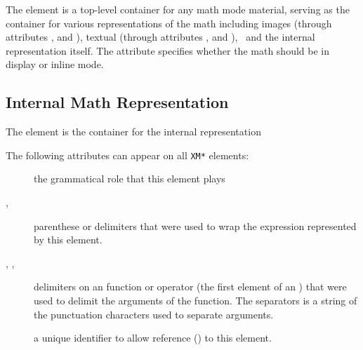 \documentclass{book}
\begin{document}
The  element is a top-level container for any math mode material,
serving as the container for various representations of the math including
images (through attributes ,  and ), 
textual (through attributes ,  and ),
\MathML\ and the internal representation itself.  
The  attribute specifies whether the math should be in display or inline mode.

\subsection{Internal Math Representation}\label{math.details.representation}
The  element is the container for the internal representation

The following attributes can appear on all \texttt{XM*} elements:
\begin{description}
\item[] the grammatical role that this element plays 
\item[, ] parenthese or delimiters that were used to wrap the
   expression represented by this element.
\item[, , ] delimiters on an function or operator
   (the first element of an )  that were used to delimit the arguments of the function.
    The separators is a string of the punctuation characters used to separate arguments.
\item[] a unique identifier to allow reference () to this element.
\end{description}
\end{document}

